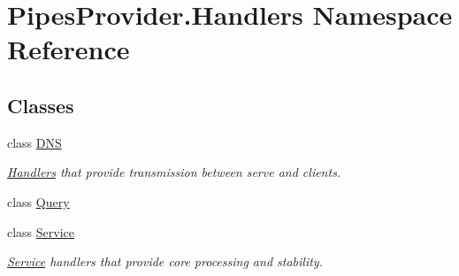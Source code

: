 \hypertarget{namespace_pipes_provider_1_1_handlers}{}\section{Pipes\+Provider.\+Handlers Namespace Reference}
\label{namespace_pipes_provider_1_1_handlers}
\subsection*{Classes}
\begin{DoxyCompactItemize}
\item 
class \mbox{\hyperlink{class_pipes_provider_1_1_handlers_1_1_d_n_s}{D\+NS}}
\begin{DoxyCompactList}\small\item\em \mbox{\hyperlink{namespace_pipes_provider_1_1_handlers}{Handlers}} that provide transmission between serve and clients. \end{DoxyCompactList}\item 
class \mbox{\hyperlink{class_pipes_provider_1_1_handlers_1_1_query}{Query}}
\item 
class \mbox{\hyperlink{class_pipes_provider_1_1_handlers_1_1_service}{Service}}
\begin{DoxyCompactList}\small\item\em \mbox{\hyperlink{class_pipes_provider_1_1_handlers_1_1_service}{Service}} handlers that provide core processing and stability. \end{DoxyCompactList}\end{DoxyCompactItemize}
